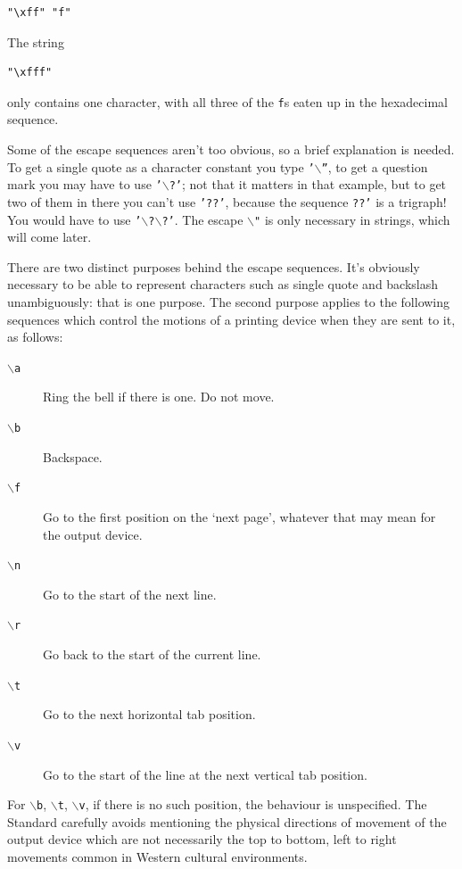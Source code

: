    \begin{Verbatim}
"\xff" "f"
\end{Verbatim}

   The string


   \begin{Verbatim}
"\xfff"
\end{Verbatim}

   only contains one character, with all three of the \texttt{f}s
    eaten up in the hexadecimal sequence.


   Some of the escape sequences aren't too obvious, so a brief explanation
    is needed. To get a single quote as a character constant you
    type \texttt{'$\backslash$''}, to get a question mark you may have to
    use \texttt{'$\backslash$?'}; not that it matters in that example, but to
    get two of them in there you can't use \texttt{'??'}, because the
    sequence \texttt{??'} is a trigraph! You would have to
    use \texttt{'$\backslash$?$\backslash$?'}. The escape \texttt{$\backslash$"} is only
    necessary in strings, which will come later.


   There are two distinct purposes behind the escape sequences. It's
    obviously necessary to be able to represent characters such as single
    quote and backslash unambiguously: that is one purpose. The second purpose
    applies to the following sequences which control the motions of a printing
    device when they are sent to it, as follows:


   \begin{description}
    \item[\texttt{$\backslash$a}] Ring the bell if there is one. Do not move.
    \item[\texttt{$\backslash$b}] Backspace.
    \item[\texttt{$\backslash$f}] Go to the first position on the `next page', whatever that may
     mean for the output device.
    \item[\texttt{$\backslash$n}] Go to the start of the next line.
    \item[\texttt{$\backslash$r}] Go back to the start of the current line.
    \item[\texttt{$\backslash$t}] Go to the next horizontal tab position.
    \item[\texttt{$\backslash$v}] Go to the start of the line at the next vertical tab position.
   \end{description}

   For \texttt{$\backslash$b}, \texttt{$\backslash$t}, \texttt{$\backslash$v}, if there is
    no such position, the behaviour is unspecified. The Standard carefully
    avoids mentioning the physical directions of movement of the output device
    which are not necessarily the top to bottom, left to right movements
    common in Western cultural environments.



